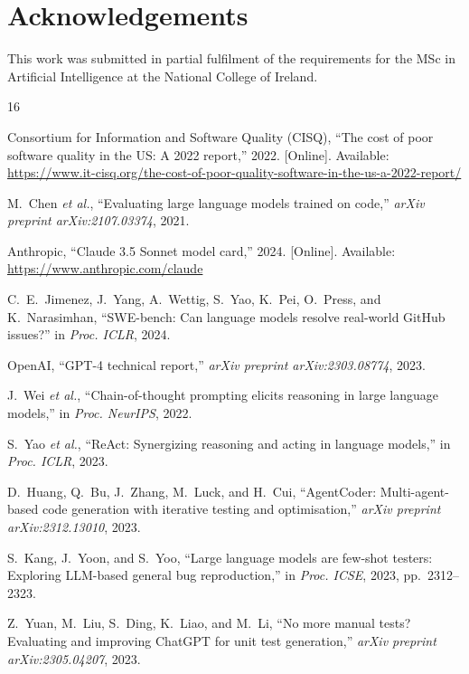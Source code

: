 \documentclass[conference]{IEEEtran}
\begin{document}
\section*{Acknowledgements}

This work was submitted in partial fulfilment of the requirements for the MSc in Artificial Intelligence at the National College of Ireland.

\begin{thebibliography}{16}

Consortium for Information and Software Quality (CISQ), ``The cost of poor software quality in the US: A 2022 report,'' 2022. [Online]. Available: \url{https://www.it-cisq.org/the-cost-of-poor-quality-software-in-the-us-a-2022-report/}

M.~Chen \textit{et al.}, ``Evaluating large language models trained on code,'' \textit{arXiv preprint arXiv:2107.03374}, 2021.

Anthropic, ``Claude 3.5 Sonnet model card,'' 2024. [Online]. Available: \url{https://www.anthropic.com/claude}

C.~E.~Jimenez, J.~Yang, A.~Wettig, S.~Yao, K.~Pei, O.~Press, and K.~Narasimhan, ``SWE-bench: Can language models resolve real-world GitHub issues?'' in \textit{Proc. ICLR}, 2024.

OpenAI, ``GPT-4 technical report,'' \textit{arXiv preprint arXiv:2303.08774}, 2023.

J.~Wei \textit{et al.}, ``Chain-of-thought prompting elicits reasoning in large language models,'' in \textit{Proc. NeurIPS}, 2022.

S.~Yao \textit{et al.}, ``ReAct: Synergizing reasoning and acting in language models,'' in \textit{Proc. ICLR}, 2023.

D.~Huang, Q.~Bu, J.~Zhang, M.~Luck, and H.~Cui, ``AgentCoder: Multi-agent-based code generation with iterative testing and optimisation,'' \textit{arXiv preprint arXiv:2312.13010}, 2023.

S.~Kang, J.~Yoon, and S.~Yoo, ``Large language models are few-shot testers: Exploring LLM-based general bug reproduction,'' in \textit{Proc. ICSE}, 2023, pp.~2312--2323.

Z.~Yuan, M.~Liu, S.~Ding, K.~Liao, and M.~Li, ``No more manual tests? Evaluating and improving ChatGPT for unit test generation,'' \textit{arXiv preprint arXiv:2305.04207}, 2023.


\end{thebibliography}
\end{document}
